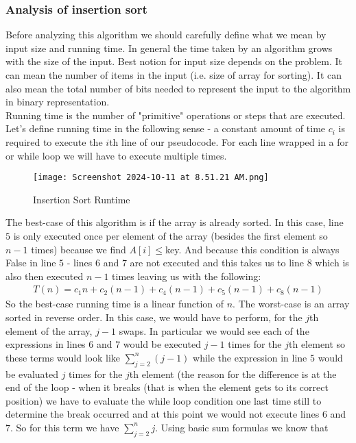 \documentclass{scrartcl}
\theoremstyle{definition}
\theoremstyle{definition}
\theoremstyle{remark}
\numberwithin{equation}{section}
\begin{document}
\subsubsection{Analysis of insertion sort}
Before analyzing this algorithm we should carefully define what we mean by input size and running time. In general the time taken by an algorithm grows with the size of the input. Best notion for input size depends on the problem. It can mean the number of items in the input (i.e. size of array for sorting). It can also mean the total number of bits needed to represent the input to the algorithm in binary representation.\\
Running time is the number of "primitive" operations or steps that are executed. Let's define running time in the following sense - a constant amount of time $c_i$ is required to execute the $i$th line of our pseudocode. For each line wrapped in a for or while loop we will have to execute multiple times. 
\begin{figure}[h]
\centering
\texttt{[image: Screenshot 2024-10-11 at 8.51.21 AM.png]}
\caption{Insertion Sort Runtime}
\end{figure}
The best-case of this algorithm is if the array is already sorted. In this case, line $5$ is only executed once per element of the array (besides the first element so $n-1$ times) because we find $A[i]\leq$key. And because this condition is always False in line $5$ - lines $6$ and $7$ are not executed and this takes us to line $8$ which is also then executed $n-1$ times leaving us with the following:
\begin{align}
    T(n) = c_1n + c_2(n-1) + c_4(n-1) + c_5(n-1) + c_8(n-1)
\end{align}
So the best-case running time is a linear function of $n$. The worst-case is an array sorted in reverse order. In this case, we would have to perform, for the $j$th element of the array, $j-1$ swaps. In particular we would see each of the expressions in lines $6$ and $7$ would be executed $j-1$ times for the $j$th element so these terms would look like $\sum_{j=2}^n(j-1)$ while the expression in line $5$ would be evaluated $j$ times for the $j$th element (the reason for the difference is at the end of the loop - when it breaks (that is when the element gets to its correct position) we have to evaluate the while loop condition one last time still to determine the break occurred and at this point we would not execute lines $6$ and $7$. So for this term we have $\sum_{j=2}^nj$. Using basic sum formulas we know that
\end{document}
